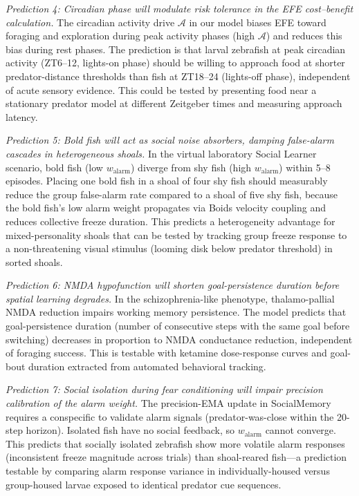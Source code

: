 \documentclass[12pt]{article}
\begin{document}
\textit{Prediction 4: Circadian phase will modulate risk tolerance
in the EFE cost--benefit calculation.}
The circadian activity drive $\mathcal{A}$ in our model biases EFE
toward foraging and exploration during peak activity phases (high
$\mathcal{A}$) and reduces this bias during rest phases.
The prediction is that larval zebrafish at peak circadian activity
(ZT6--12, lights-on phase) should be willing to approach food at
shorter predator-distance thresholds than fish at ZT18--24 (lights-off
phase), independent of acute sensory evidence.
This could be tested by presenting food near a stationary predator
model at different Zeitgeber times and measuring approach latency.

\textit{Prediction 5: Bold fish will act as social noise absorbers,
damping false-alarm cascades in heterogeneous shoals.}
In the virtual laboratory Social Learner scenario, bold fish (low
$w_\text{alarm}$) diverge from shy fish (high $w_\text{alarm}$)
within 5--8 episodes.
Placing one bold fish in a shoal of four shy fish should measurably
reduce the group false-alarm rate compared to a shoal of five shy fish,
because the bold fish's low alarm weight propagates via Boids velocity
coupling and reduces collective freeze duration.
This predicts a heterogeneity advantage for mixed-personality shoals
that can be tested by tracking group freeze response to a non-threatening
visual stimulus (looming disk below predator threshold) in sorted shoals.

\textit{Prediction 6: NMDA hypofunction will shorten goal-persistence
duration before spatial learning degrades.}
In the schizophrenia-like phenotype, thalamo-pallial NMDA reduction
impairs working memory persistence.
The model predicts that goal-persistence duration (number of consecutive
steps with the same goal before switching) decreases in proportion to
NMDA conductance reduction, independent of foraging success.
This is testable with ketamine dose-response curves and goal-bout
duration extracted from automated behavioral tracking.

\textit{Prediction 7: Social isolation during fear conditioning will
impair precision calibration of the alarm weight.}
The precision-EMA update in SocialMemory requires a conspecific to
validate alarm signals (predator-was-close within the 20-step horizon).
Isolated fish have no social feedback, so $w_\text{alarm}$ cannot
converge.
This predicts that socially isolated zebrafish show more volatile
alarm responses (inconsistent freeze magnitude across trials) than
shoal-reared fish---a prediction testable by comparing alarm response
variance in individually-housed versus group-housed larvae exposed to
identical predator cue sequences.
\end{document}
